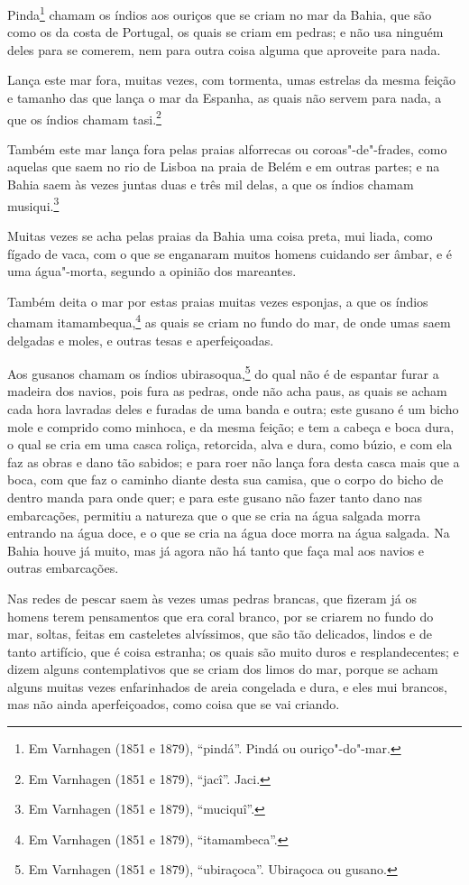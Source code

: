 Pinda\footnote{ Em Varnhagen (1851 e 1879), ``pindá''. Pindá ou ouriço"-do"-mar.} chamam os
índios aos ouriços que se criam no mar da Bahia, que são como os da costa de Portugal, os
quais se criam em pedras; e não usa ninguém deles para se comerem, nem para outra coisa
alguma que aproveite para nada.

Lança este mar fora, muitas vezes, com tormenta, umas estrelas da mesma feição e tamanho
das que lança o mar da Espanha, as quais não servem para nada, a que os índios chamam
tasi.\footnote{ Em Varnhagen (1851 e 1879), ``jacî''. Jaci.}

Também este mar lança fora pelas praias alforrecas ou coroas"-de"-frades, como aquelas que
saem no rio de Lisboa na praia de Belém e em outras partes; e na Bahia saem às vezes
juntas duas e três mil delas, a que os índios chamam musiqui.\footnote{ Em Varnhagen (1851
e 1879), ``muciquî''.}

Muitas vezes se acha pelas praias da Bahia uma coisa preta, mui liada, como fígado de
vaca, com o que se enganaram muitos homens cuidando ser âmbar, e é uma água"-morta, segundo
a opinião dos mareantes.

Também deita o mar por estas praias muitas vezes esponjas, a que os índios chamam
itamambequa,\footnote{ Em Varnhagen (1851 e 1879), ``itamambeca''.} as quais se criam no
fundo do mar, de onde umas saem delgadas e moles, e outras tesas e aperfeiçoadas.

Aos gusanos chamam os índios ubirasoqua,\footnote{ Em Varnhagen (1851 e 1879),
``ubiraçoca''. Ubiraçoca ou gusano.} do qual não é de espantar furar a madeira dos
navios, pois fura as pedras, onde não acha paus, as quais se acham cada hora lavradas
deles e furadas de uma banda e outra; este gusano é um bicho mole e comprido como minhoca,
e da mesma feição; e tem a cabeça e boca dura, o qual se cria em uma casca roliça,
retorcida, alva e dura, como búzio, e com ela faz as obras e dano tão sabidos; e para roer
não lança fora desta casca mais que a boca, com que faz o caminho diante desta sua camisa,
que o corpo do bicho de dentro manda para onde quer; e para este gusano não fazer tanto
dano nas embarcações, permitiu a natureza que o que se cria na água salgada morra entrando
na água doce, e o que se cria na água doce morra na água salgada. Na Bahia houve já muito,
mas já agora não há tanto que faça mal aos navios e outras embarcações.

Nas redes de pescar saem às vezes umas pedras brancas, que fizeram já os homens terem
pensamentos que era coral branco, por se criarem no fundo do mar, soltas, feitas em
casteletes alvíssimos, que são tão delicados, lindos e de tanto artifício, que é coisa
estranha; os quais são muito duros e resplandecentes; e dizem alguns contemplativos que se
criam dos limos do mar, porque se acham alguns muitas vezes enfarinhados de areia
congelada e dura, e eles mui brancos, mas não ainda aperfeiçoados, como coisa que se vai
criando.

